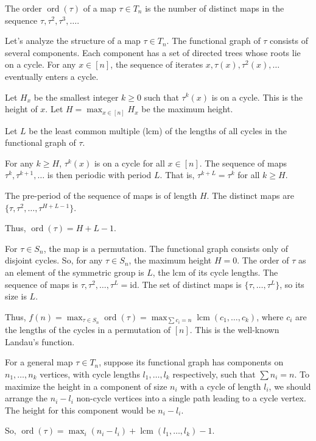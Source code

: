 \documentclass[12pt,a4paper]{article}
\theoremstyle{definition}
\begin{document}
    The order $\operatorname{ord}(\tau)$ of a map $\tau \in T_n$ is the number of distinct maps in the sequence $\tau, \tau^2, \tau^3, \dots$.

    Let's analyze the structure of a map $\tau \in T_n$. The functional graph of $\tau$ consists of several components. Each component has a set of directed trees whose roots lie on a cycle. For any $x \in [n]$, the sequence of iterates $x, \tau(x), \tau^2(x), \dots$ eventually enters a cycle.

    Let $H_x$ be the smallest integer $k \ge 0$ such that $\tau^k(x)$ is on a cycle. This is the height of $x$. Let $H = \max_{x \in [n]} H_x$ be the maximum height.

    Let $L$ be the least common multiple (lcm) of the lengths of all cycles in the functional graph of $\tau$.

    For any $k \ge H$, $\tau^k(x)$ is on a cycle for all $x \in [n]$. The sequence of maps $\tau^k, \tau^{k+1}, \dots$ is then periodic with period $L$. That is, $\tau^{k+L} = \tau^k$ for all $k \ge H$.

    The pre-period of the sequence of maps is of length $H$. The distinct maps are $\{\tau, \tau^2, \dots, \tau^{H+L-1}\}$.

    Thus, $\operatorname{ord}(\tau) = H+L-1$.

    For $\tau \in S_n$, the map is a permutation. The functional graph consists only of disjoint cycles. So, for any $\tau \in S_n$, the maximum height $H=0$. The order of $\tau$ as an element of the symmetric group is $L$, the lcm of its cycle lengths. The sequence of maps is $\tau, \tau^2, \dots, \tau^L=\mathrm{id}$. The set of distinct maps is $\{\tau, \dots, \tau^L\}$, so its size is $L$.

    Thus, $f(n) = \max_{\tau \in S_n} \operatorname{ord}(\tau) = \max_{\sum c_i=n} \operatorname{lcm}(c_1, \dots, c_k)$, where $c_i$ are the lengths of the cycles in a permutation of $[n]$. This is the well-known Landau's function.

    For a general map $\tau \in T_n$, suppose its functional graph has components on $n_1, \dots, n_k$ vertices, with cycle lengths $l_1, \dots, l_k$ respectively, such that $\sum n_i=n$. To maximize the height in a component of size $n_i$ with a cycle of length $l_i$, we should arrange the $n_i-l_i$ non-cycle vertices into a single path leading to a cycle vertex. The height for this component would be $n_i-l_i$.

    So, $\operatorname{ord}(\tau) = \max_i(n_i-l_i) + \operatorname{lcm}(l_1, \dots, l_k)-1$.
\end{document}
